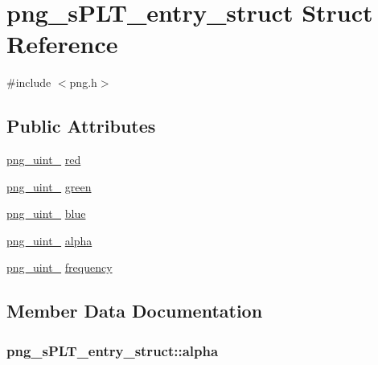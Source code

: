 \hypertarget{structpng__sPLT__entry__struct}{}\section{png\+\_\+s\+P\+L\+T\+\_\+entry\+\_\+struct Struct Reference}
\label{structpng__sPLT__entry__struct}


{\ttfamily \#include $<$png.\+h$>$}

\subsection*{Public Attributes}
\begin{DoxyCompactItemize}
\item 
\hyperlink{pngrutil_8c_a7b67546e4211b127dd370e8ef197bc3f}{png\+\_\+uint\+\_} \hyperlink{structpng__sPLT__entry__struct_a05ba3cef8aa2c43d1f52c0300c525fd9}{red}
\item 
\hyperlink{pngrutil_8c_a7b67546e4211b127dd370e8ef197bc3f}{png\+\_\+uint\+\_} \hyperlink{structpng__sPLT__entry__struct_a3b4269fb63b4087bd618a6741b805554}{green}
\item 
\hyperlink{pngrutil_8c_a7b67546e4211b127dd370e8ef197bc3f}{png\+\_\+uint\+\_} \hyperlink{structpng__sPLT__entry__struct_a2af6281d3b400362886a43977ebcb7db}{blue}
\item 
\hyperlink{pngrutil_8c_a7b67546e4211b127dd370e8ef197bc3f}{png\+\_\+uint\+\_} \hyperlink{structpng__sPLT__entry__struct_abea98962a064e2a05f460b9f2ea2f47b}{alpha}
\item 
\hyperlink{pngrutil_8c_a7b67546e4211b127dd370e8ef197bc3f}{png\+\_\+uint\+\_} \hyperlink{structpng__sPLT__entry__struct_ad8095a15bb5a054c12ef911478c5f3a3}{frequency}
\end{DoxyCompactItemize}


\subsection{Member Data Documentation}
\hypertarget{structpng__sPLT__entry__struct_abea98962a064e2a05f460b9f2ea2f47b}{}
\subsubsection[{alpha}]{ png\+\_\+s\+P\+L\+T\+\_\+entry\+\_\+struct\+::alpha}\label{structpng__sPLT__entry__struct_abea98962a064e2a05f460b9f2ea2f47b}
\hypertarget{structpng__sPLT__entry__struct_a2af6281d3b400362886a43977ebcb7db}{}
